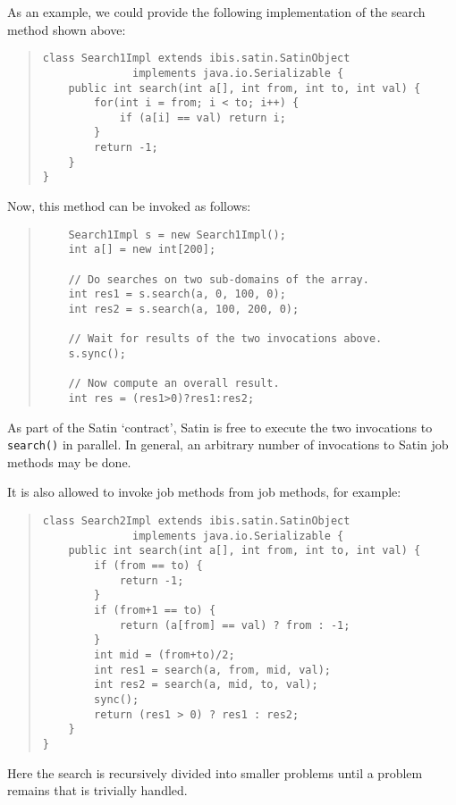 \documentclass[10pt]{article}
\begin{document}
As an example, we could provide the following implementation of the
search method shown above:

\begin{quote}
\begin{verbatim}
class Search1Impl extends ibis.satin.SatinObject
              implements java.io.Serializable {
    public int search(int a[], int from, int to, int val) {
        for(int i = from; i < to; i++) {
            if (a[i] == val) return i;
        }
        return -1;
    }
}
\end{verbatim}
\end{quote}

Now, this method can be invoked as follows:

\begin{quote}
\begin{verbatim}
    Search1Impl s = new Search1Impl();
    int a[] = new int[200];

    // Do searches on two sub-domains of the array.
    int res1 = s.search(a, 0, 100, 0);
    int res2 = s.search(a, 100, 200, 0);

    // Wait for results of the two invocations above.
    s.sync();

    // Now compute an overall result.
    int res = (res1>0)?res1:res2;
\end{verbatim}
\end{quote}

As part of the Satin `contract', Satin is free to execute the two
invocations to \texttt{search()} in parallel.
In general, an arbitrary number of
invocations to Satin job methods may be done.

It is also allowed to invoke job methods from job methods, for example:

\begin{quote}
\begin{verbatim}
class Search2Impl extends ibis.satin.SatinObject
              implements java.io.Serializable {
    public int search(int a[], int from, int to, int val) {
        if (from == to) {
            return -1;
        }
        if (from+1 == to) {
            return (a[from] == val) ? from : -1;
        }
        int mid = (from+to)/2;
        int res1 = search(a, from, mid, val);
        int res2 = search(a, mid, to, val);
        sync();
        return (res1 > 0) ? res1 : res2;
    }
}
\end{verbatim}
\end{quote}
\noindent
Here the search is recursively divided into smaller problems until
a problem remains that is trivially handled.
\end{document}
